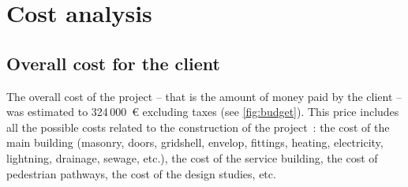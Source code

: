 

\section{Cost analysis}\label{sec=costanalysis}
\subsection{Overall cost for the client}
The overall cost of the project -- that is the amount of money paid by the client -- was estimated to 324\,000~€ excluding taxes (see \cref{fig:budget}). This price includes all the possible costs related to the construction of the project~: the cost of the main building (masonry, doors, gridshell, envelop, fittings, heating, electricity, lightning, drainage, sewage, etc.), the cost of the service building, the cost of pedestrian pathways, the cost of the design studies, etc.

